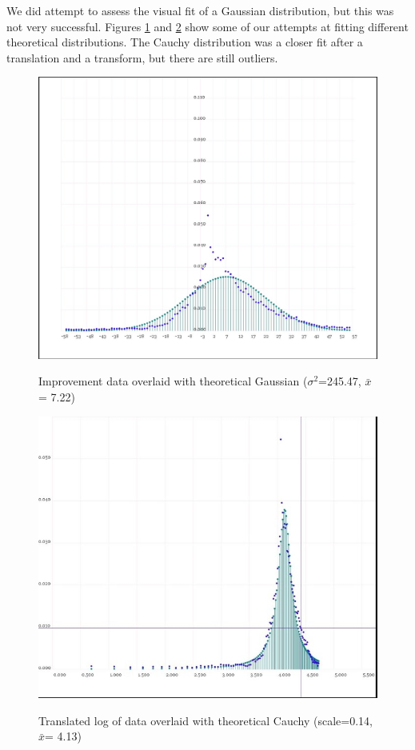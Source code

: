 \documentclass[10pt]{article}
\begin{document}
We did attempt to assess the visual fit of a Gaussian distribution, but this was not very successful. Figures \ref{ShapeOfImprovementWrtNormal} and \ref{ShapeOfTranslatedLogOffImprovementWrtCauchy} show some of our attempts at fitting different theoretical distributions. The Cauchy distribution was a closer fit after a translation and a transform, but there are still outliers.
\begin{figure}
\caption{Improvement data overlaid with theoretical Gaussian (${\sigma}^2$=245.47, $\bar{x}$= 7.22)}
\label{ShapeOfImprovementWrtNormal}
\begin{center}
\includegraphics[width=120mm]{ReportMedia/ShapeOfImprovementWrtNormal.jpg}\\
\end{center}
\end{figure}

\begin{figure}
\caption{Translated log of data overlaid with theoretical Cauchy (scale=0.14, $\bar{x}$= 4.13)}
\label{ShapeOfTranslatedLogOffImprovementWrtCauchy}
\begin{center}
\includegraphics[width=120mm]{ReportMedia/ShapeOfTranslatedLogOffImprovementWrtCauchy.jpg}\\
\end{center}
\end{figure}
\end{document}
